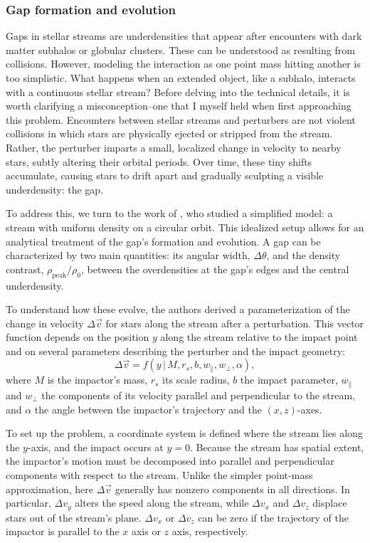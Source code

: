         \subsubsection{Gap formation and evolution}
            Gaps in stellar streams are underdensities that appear after encounters with dark matter subhalos or globular clusters. These can be understood as resulting from collisions. However, modeling the interaction as one point mass hitting another is too simplistic. What happens when an extended object, like a subhalo, interacts with a continuous stellar stream? Before delving into the technical details, it is worth clarifying a misconception--one that I myself held when first approaching this problem. Encounters between stellar streams and perturbers are not violent collisions in which stars are physically ejected or stripped from the stream. Rather, the perturber imparts a small, localized change in velocity to nearby stars, subtly altering their orbital periods. Over time, these tiny shifts accumulate, causing stars to drift apart and gradually sculpting a visible underdensity: the gap. 
            
            To address this, we turn to the work of \citet{2015MNRAS.450.1136E}, who studied a simplified model: a stream with uniform density on a circular orbit. This idealized setup allows for an analytical treatment of the gap's formation and evolution. A gap can be characterized by two main quantities: its angular width, $\Delta \theta$, and the density contrast, $\rho_{\mathrm{peak}}/\rho_0$, between the overdensities at the gap's edges and the central underdensity.

            To understand how these evolve, the authors derived a parameterization of the change in velocity $\Delta \vec{v}$ for stars along the stream after a perturbation. This vector function depends on the position $y$ along the stream relative to the impact point and on several parameters describing the perturber and the impact geometry:
            \[
            \Delta \vec{v} = f(y \,|\, M, r_s, b, w_\parallel, w_\perp, \alpha),
            \]
            where $M$ is the impactor's mass, $r_s$ its scale radius, $b$ the impact parameter, $w_\parallel$ and $w_\perp$ the components of its velocity parallel and perpendicular to the stream, and $\alpha$ the angle between the impactor's trajectory and the $(x,z)$-axes.

            To set up the problem, a coordinate system is defined where the stream lies along the $y$-axis, and the impact occurs at $y=0$. Because the stream has spatial extent, the impactor's motion must be decomposed into parallel and perpendicular components with respect to the stream. Unlike the simpler point-mass approximation, here $\Delta \vec{v}$ generally has nonzero components in all directions. In particular, $\Delta v_y$ alters the speed along the stream, while $\Delta v_x$ and $\Delta v_z$ displace stars out of the stream's plane. $\Delta v_x$ or $\Delta v_z$ can be zero if the trajectory of the impactor is parallel to the $x$ axis or $z$ axis, respectively. 


